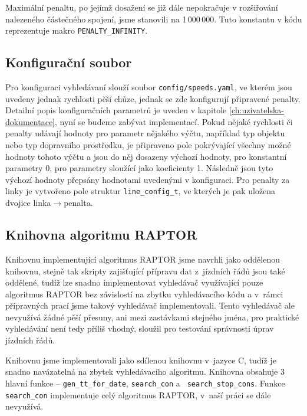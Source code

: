 Maximální penaltu, po jejímž dosažení se již dále nepokračuje v rozšiřování
nalezeného částečného spojení, jsme stanovili na 1\,000\,000. Tuto konstantu v
kódu reprezentuje makro {\tt PENALTY\_INFINITY}.

\subsection{Konfigurační soubor}
Pro konfiguraci vyhledávaní slouží soubor {\tt config/speeds.yaml}, ve kterém
jsou uvedeny jednak rychlosti pěší chůze, jednak se zde konfigurují připravené
penalty. Detailní popis konfiguračních parametrů je uveden v kapitole
\ref{ch:uzivatelska-dokumentace}, nyní se budeme zabývat implementací. Pokud
nějaké rychlosti či penalty udávají hodnoty pro parametr nějakého výčtu,
například typ objektu nebo typ dopravního prostředku, je připraveno pole
pokrývající všechny možné hodnoty tohoto výčtu a jsou do něj dosazeny výchozí
hodnoty, pro konstantní parametry 0, pro parametry sloužící jako koeficienty 1.
Následně jsou tyto výchozí hodnoty přepsány hodnotami uvedenými v konfiguraci.
Pro penalty za linky je vytvořeno pole struktur {\tt line\_config\_t}, ve
kterých je pak uložena dvojice linka$\rightarrow$penalta. 

\subsection{Knihovna algoritmu RAPTOR}
Knihovnu implementující algoritmus RAPTOR jsme navrhli jako oddělenou knihovnu,
stejně tak skripty zajišťující přípravu dat z~jízdních řádů jsou také oddělené,
tudíž lze snadno implementovat vyhledávač využívající pouze algoritmus RAPTOR
bez závislostí na zbytku vyhledávacího kódu a v~rámci přípravných prací jsme
takový vyhledávač implementovali. Tento vyhledávač ale
nevyužívá žádné pěší přesuny, ani mezi zastávkami stejného jména, pro praktické
vyhledávání není tedy příliš vhodný, sloužil pro testování správnosti úprav
jízdních řádů.

Knihovnu jsme implementovali jako sdílenou knihovnu v~jazyce C, tudíž je snadno
navázatelná na zbytek vyhledávacího algoritmu. Knihovna obsahuje 3 hlavní
funkce -- {\tt gen\_tt\_for\_date}, {\tt search\_con} a {\tt
search\_stop\_cons}. Funkce {\tt search\_con} implementuje celý algoritmus
RAPTOR, v~naší práci se dále nevyužívá.

